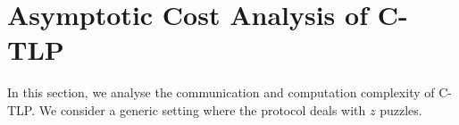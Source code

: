 


 
 \section{Asymptotic Cost Analysis of C-TLP}\label{TLP-cost-compare}
 
 In this section, we analyse  the communication and computation complexity of C-TLP. We consider a generic setting where the protocol deals with $z$ puzzles. %
 
%
%
